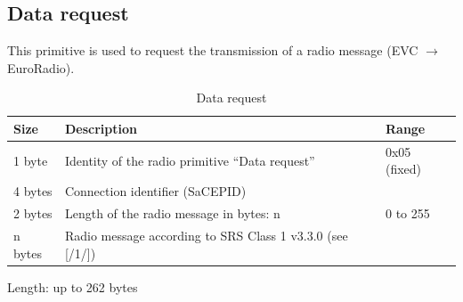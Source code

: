 \documentclass[nocc]{template/openetcs_report}
\begin{document}
\subsection{Data request}
This primitive is used to request the transmission of a radio message (EVC $\rightarrow$ EuroRadio).
 			\begin{longtable}{|l|l|l|}
				\caption{Data request}\\ 
				\hline
				
					\begin{minipage}[t]{0.1\linewidth} \textbf{Size}	\end{minipage}
				&	\begin{minipage}[t]{0.5\linewidth} \textbf{Description}	\end{minipage}
				&	\begin{minipage}[t]{0.3\linewidth} \textbf{Range} \end{minipage} \\
				
				\hline
					 \begin{minipage}[t]{0.1\linewidth}1 byte \end{minipage}
					&\begin{minipage}[t]{0.6\linewidth}Identity of the radio primitive "`Data request"'	\end{minipage}
					&\begin{minipage}[t]{0.3\linewidth}0x05 (fixed) \end{minipage} \\
					
				\hline
					 \begin{minipage}[t]{0.1\linewidth}4 bytes \end{minipage}
					&\begin{minipage}[t]{0.6\linewidth}Connection identifier (SaCEPID)	\end{minipage}
					&\begin{minipage}[t]{0.3\linewidth} \end{minipage} \\
					
				\hline
					 \begin{minipage}[t]{0.1\linewidth}2 bytes \end{minipage}
					&\begin{minipage}[t]{0.6\linewidth}Length of the radio message in bytes: n	\end{minipage}
					&\begin{minipage}[t]{0.3\linewidth}0 to 255 \end{minipage} \\
					
				\hline
					 \begin{minipage}[t]{0.1\linewidth}n bytes \end{minipage}
					&\begin{minipage}[t]{0.6\linewidth}Radio message according to SRS Class 1 v3.3.0 (see [/1/])	\end{minipage}
					&\begin{minipage}[t]{0.3\linewidth}\end{minipage} \\
					
				\hline	
			\end{longtable}
			Length: up to 262 bytes	
\end{document}
